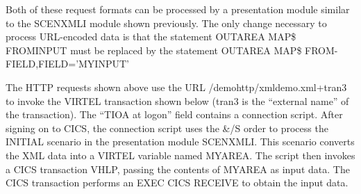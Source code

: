 \documentclass[letterpaper,10pt,english]{sphinxmanual}
\begin{document}
\begin{sphinxVerbatim}[commandchars=\\\{\}]
\end{sphinxVerbatim}


Both of these request formats can be processed by a presentation module similar to the SCENXMLI module shown
previously. The only change necessary to process URL-encoded data is that the statement OUTAREA MAP\$ FROMINPUT
must be replaced by the statement OUTAREA MAP\$ FROM-FIELD,FIELD=’MYINPUT’


The HTTP requests shown above use the URL /demohttp/xmldemo.xml+tran3 to invoke the VIRTEL transaction shown
below (tran3 is the “external name” of the transaction). The “TIOA at logon” field contains a connection script. After
signing on to CICS, the connection script uses the \&/S order to process the INITIAL scenario in the presentation module
SCENXMLI. This scenario converts the XML data into a VIRTEL variable named MYAREA. The script then invokes a CICS
transaction VHLP, passing the contents of MYAREA as input data. The CICS transaction performs an EXEC CICS RECEIVE
to obtain the input data.
\end{document}
